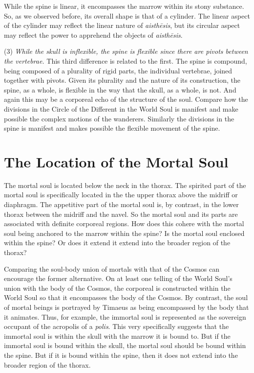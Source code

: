 While the spine is linear, it encompasses the marrow within its stony substance. So, as we observed before, its overall shape is that of a cylinder. The linear aspect of the cylinder may reflect the linear nature of \emph{aisthēsis}, but its circular aspect may reflect the power to apprehend the objects of \emph{aisthēsis}.

(3) \emph{While the skull is inflexible, the spine is flexible since there are pivots between the vertebrae.} This third difference is related to the first. The spine is compound, being composed of a plurality of rigid parts, the individual vertebrae, joined together with pivots. Given its plurality and the nature of its construction, the spine, as a whole, is flexible in the way that the skull, as a whole, is not. And again this may be a corporeal echo of the structure of the soul. Compare how the divisions in the Circle of the Different in the World Soul is manifest and make possible the complex motions of the wanderers. Similarly the divisions in the spine is manifest and makes possible the flexible movement of the spine. 



\section{The Location of the Mortal Soul} %
\label{sec:the_location_of_the_mortal_soul}

The mortal soul is located below the neck in the thorax. The spirited part of the mortal soul is specifically located in the the upper thorax above the midriff or diaphragm. The appetitive part of the mortal soul is, by contrast, in the lower thorax between the midriff and the navel. So the mortal soul and its parts are associated with definite corporeal regions. How does this cohere with the mortal soul being anchored to the marrow within the spine? Is the mortal soul enclosed within the spine? Or does it extend it extend into the broader region of the thorax?

Comparing the soul-body union of mortals with that of the Cosmos can encourage the former alternative. On at least one telling of the World Soul's union with the body of the Cosmos, the corporeal is constructed within the World Soul so that it encompasses the body of the Cosmos. By contrast, the soul of mortal beings is portrayed by Timaeus as being encompassed by the body that it animates. Thus, for example, the immortal soul is represented as the sovereign occupant of the acropolis of a \emph{polis}. This very specifically suggests that the immortal soul is within the skull with the marrow it is bound to. But if the immortal soul is bound within the skull, the mortal soul should be bound within the spine. But if it is bound within the spine, then it does not extend into the broader region of the thorax.

